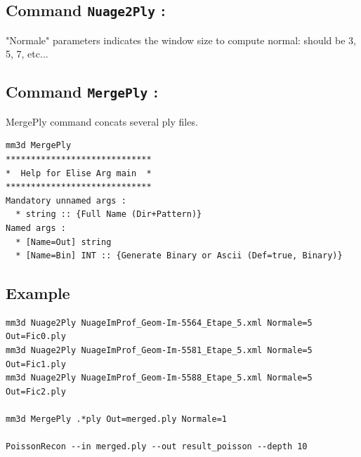 \subsection{Command {\tt Nuage2Ply} :}

"Normale" parameters indicates the window size to compute normal: should be 3, 5, 7, etc...

\subsection{Command {\tt MergePly} :}

MergePly command concats several ply files.

\begin{verbatim}
mm3d MergePly
*****************************
*  Help for Elise Arg main  *
*****************************
Mandatory unnamed args :
  * string :: {Full Name (Dir+Pattern)}
Named args :
  * [Name=Out] string
  * [Name=Bin] INT :: {Generate Binary or Ascii (Def=true, Binary)}
\end{verbatim}

\subsection{Example}

\begin{verbatim}
mm3d Nuage2Ply NuageImProf_Geom-Im-5564_Etape_5.xml Normale=5 Out=Fic0.ply
mm3d Nuage2Ply NuageImProf_Geom-Im-5581_Etape_5.xml Normale=5 Out=Fic1.ply
mm3d Nuage2Ply NuageImProf_Geom-Im-5588_Etape_5.xml Normale=5 Out=Fic2.ply

mm3d MergePly .*ply Out=merged.ply Normale=1

PoissonRecon --in merged.ply --out result_poisson --depth 10
\end{verbatim}

